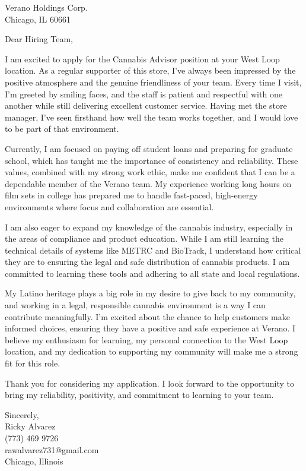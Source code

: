\documentclass[a4paper,10pt]{letter}
\begin{document}
\begin{letter}{Verano Holdings Corp. \\
Chicago, IL 60661}

\opening{Dear Hiring Team,}

I am excited to apply for the Cannabis Advisor position at your West Loop location. As a regular supporter of this store, I’ve always been impressed by the positive atmosphere and the genuine friendliness of your team. Every time I visit, I’m greeted by smiling faces, and the staff is patient and respectful with one another while still delivering excellent customer service. Having met the store manager, I’ve seen firsthand how well the team works together, and I would love to be part of that environment.

Currently, I am focused on paying off student loans and preparing for graduate school, which has taught me the importance of consistency and reliability. These values, combined with my strong work ethic, make me confident that I can be a dependable member of the Verano team. My experience working long hours on film sets in college has prepared me to handle fast-paced, high-energy environments where focus and collaboration are essential.

I am also eager to expand my knowledge of the cannabis industry, especially in the areas of compliance and product education. While I am still learning the technical details of systems like METRC and BioTrack, I understand how critical they are to ensuring the legal and safe distribution of cannabis products. I am committed to learning these tools and adhering to all state and local regulations.

My Latino heritage plays a big role in my desire to give back to my community, and working in a legal, responsible cannabis environment is a way I can contribute meaningfully. I’m excited about the chance to help customers make informed choices, ensuring they have a positive and safe experience at Verano. I believe my enthusiasm for learning, my personal connection to the West Loop location, and my dedication to supporting my community will make me a strong fit for this role.

Thank you for considering my application. I look forward to the opportunity to bring my reliability, positivity, and commitment to learning to your team.

\vspace{1em}

Sincerely, \\ 
Ricky Alvarez \\
(773) 469 9726 \\
rawalvarez731@gmail.com \\
Chicago, Illinois

\end{letter}
\end{document}
